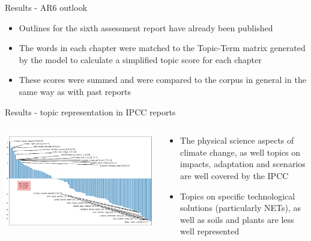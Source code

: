 \documentclass[9pt]{beamer}
\begin{document}
\begin{frame}{Results - AR6 outlook}

\begin{itemize}
	\item<1-> Outlines for the sixth assessment report have already been published
	\item<2-> The words in each chapter were matched to the Topic-Term matrix generated by the model to calculate a simplified topic score for each chapter
	\item<3-> These scores were summed and were compared to the corpus in general in the same way as with past reports
\end{itemize}



\end{frame}


\begin{frame}{Results - topic representation in IPCC reports}

\begin{columns}
	\begin{column}{0.7\linewidth}
		\begin{center}
			\includegraphics[width=\linewidth]{../plots/ipcc_representation/ipcc_rep_662_AR6.png}
		\end{center}
	\end{column}
	\begin{column}{0.3\linewidth}
		\begin{center}
			\begin{itemize}
				\item The physical science aspects of climate change, as well topics on impacts, adaptation and scenarios are well covered by the IPCC
				\item Topics on specific technological solutions (particularly NETs), as well as soils and plants are less well represented
			\end{itemize}
		\end{center}
	\end{column}
\end{columns}

\end{frame}
\end{document}
